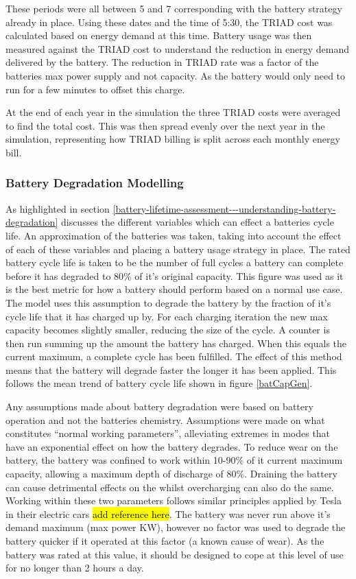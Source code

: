These periods were all between 5 and 7 corresponding with the battery
strategy already in place. Using these dates and the time of 5:30, the
TRIAD cost was calculated based on energy demand at this time. Battery
usage was then measured against the TRIAD cost to understand the
reduction in energy demand delivered by the battery. The reduction in
TRIAD rate was a factor of the batteries max power supply and not
capacity. As the battery would only need to run for a few minutes to
offset this charge.

At the end of each year in the simulation the three TRIAD costs were
averaged to find the total cost. This was then spread evenly over the
next year in the simulation, representing how TRIAD billing is split
across each monthly energy bill.

\subsubsection{Battery Degradation
Modelling}\label{battery-degradation-modelling}

As highlighted in section
\ref{battery-lifetime-assessment---understanding-battery-degradation}
discusses the different variables which can effect a batteries cycle
life. An approximation of the batteries was taken, taking into account
the effect of each of these variables and placing a battery usage
strategy in place. The rated battery cycle life is taken to be the
number of full cycles a battery can complete before it has degraded to
80\% of it's original capacity. This figure was used as it is the best
metric for how a battery should perform based on a normal use case. The
model uses this assumption to degrade the battery by the fraction of
it's cycle life that it has charged up by. For each charging iteration
the new max capacity becomes slightly smaller, reducing the size of the
cycle. A counter is then run summing up the amount the battery has
charged. When this equals the current maximum, a complete cycle has been
fulfilled. The effect of this method means that the battery will degrade
faster the longer it has been applied. This follows the mean trend of
battery cycle life shown in figure \ref{batCapGen}.

Any assumptions made about battery degradation were based on battery
operation and not the batteries chemistry. Assumptions were made on what
constitutes ``normal working parameters'', alleviating extremes in modes
that have an exponential effect on how the battery degrades. To reduce
wear on the battery, the battery was confined to work within 10-90\% of
it current maximum capacity, allowing a maximum depth of discharge of
80\%. Draining the battery can cause detrimental effects on the whilst
overcharging can also do the same. Working within these two parameters
follows similar principles applied by Tesla in their electric cars
\hl{add reference here}. The battery was never run above it's demand
maximum (max power KW), however no factor was used to degrade the
battery quicker if it operated at this factor (a known cause of wear).
As the battery was rated at this value, it should be designed to cope at
this level of use for no longer than 2 hours a day.

